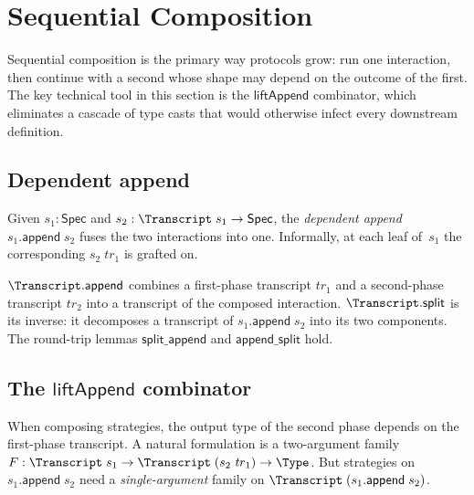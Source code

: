 
\section{Sequential Composition}\label{sec:interaction-composition}

Sequential composition is the primary way protocols grow: run one interaction,
then continue with a second whose shape may depend on the outcome of the first.
The key technical tool in this section is the $\mathsf{liftAppend}$
combinator, which eliminates a cascade of type casts that would otherwise infect
every downstream definition.

\subsection{Dependent append}

\begin{definition}
  \label{int:spec-append}
  Given $s_1 : \mathsf{Spec}$ and $s_2 : \Transcript\;s_1 \to \mathsf{Spec}$,
  the \emph{dependent append} $s_1.\mathsf{append}\;s_2$ fuses the two
  interactions into one.  Informally, at each leaf of~$s_1$ the corresponding
  $s_2\;\mathit{tr}_1$ is grafted on.
\end{definition}

\begin{definition}
  \label{int:transcript-append-split}
  $\Transcript.\mathsf{append}$ combines a first-phase transcript $\mathit{tr}_1$
  and a second-phase transcript $\mathit{tr}_2$ into a transcript of the composed
  interaction.  $\Transcript.\mathsf{split}$ is its inverse: it decomposes a
  transcript of $s_1.\mathsf{append}\;s_2$ into its two components.  The
  round-trip lemmas $\mathsf{split\_append}$ and $\mathsf{append\_split}$ hold.
\end{definition}

\subsection{The \texorpdfstring{$\mathsf{liftAppend}$}{liftAppend} combinator}

When composing strategies, the output type of the second phase depends on the
first-phase transcript.  A natural formulation is a two-argument family
$F : \Transcript\;s_1 \to \Transcript\;(s_2\;\mathit{tr}_1) \to \Type$.
But strategies on $s_1.\mathsf{append}\;s_2$ need a \emph{single-argument}
family on $\Transcript\;(s_1.\mathsf{append}\;s_2)$.

